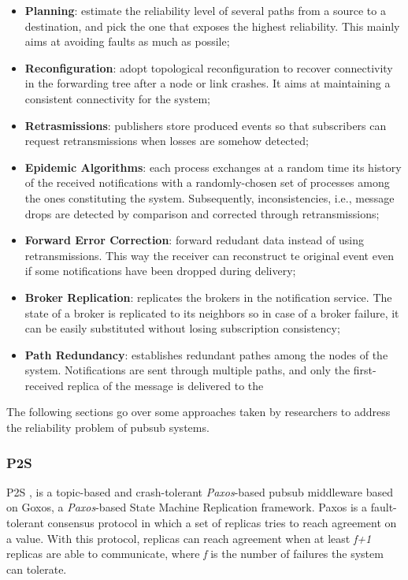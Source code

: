 \begin{itemize}
  \item \textbf{Planning}: estimate the reliability level of several paths from a source to a destination, and pick the one that exposes the highest reliability. This mainly aims at avoiding faults as much as possile;
  \item \textbf{Reconfiguration}: adopt topological reconfiguration to recover connectivity in the forwarding tree after a node or link crashes. It aims at maintaining a consistent connectivity for the system;
  \item \textbf{Retrasmissions}: publishers store produced events so that subscribers can request retransmissions when losses are somehow detected;
  \item \textbf{Epidemic Algorithms}: each process exchanges at a random time its history of the received notifications with a randomly-chosen set of processes among the ones constituting the system. Subsequently, inconsistencies, i.e., message drops are detected by comparison and corrected through retransmissions;
  \item \textbf{Forward Error Correction}: forward redudant data instead of using retransmissions. This way the receiver can reconstruct te original event even if some notifications have been dropped during delivery;
  \item \textbf{Broker Replication}: replicates the brokers in the notification service. The state of a broker is replicated to its neighbors so in case of a broker failure, it can be easily substituted without losing subscription consistency;
  \item \textbf{Path Redundancy}: establishes redundant pathes among the nodes of the system. Notifications are sent through multiple paths, and only the first-received replica of the message is delivered to the   
\end{itemize}

The following sections go over some approaches taken by researchers to address the reliability problem of \gls{pubsub} systems.

\subsubsection{P2S}

P2S \cite{p2s}, is a topic-based and crash-tolerant \textit{Paxos}-based \gls{pubsub} middleware based on Goxos, a \textit{Paxos}-based State Machine Replication framework. Paxos is a fault-tolerant consensus protocol in which a set of replicas tries to reach agreement on a value. With this protocol, replicas can reach agreement when at least \textit{f+1} replicas are able to communicate, where \textit{f} is the number of failures the system can tolerate.

